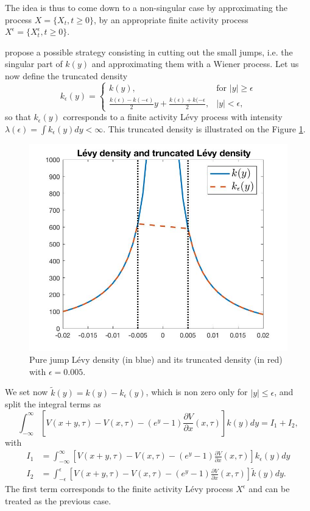 The idea is thus to come down to a non-singular case by approximating the process $X = \{X_t, t\geq 0\}$, by an appropriate finite activity process $X^\epsilon =\{X_t^\epsilon,t\geq0\}$.

\citeauthor{CV05} propose a possible strategy consisting in cutting out the small jumps, i.e. the singular part of $k(y)$ and approximating them with a Wiener process. Let us now define the truncated density 
$$k_\epsilon(y)=\begin{cases}
k(y), &\text{for }|y|\geq\epsilon\\
\frac{k(\epsilon)-k(-\epsilon)}{2}y+\frac{k(\epsilon)+k(-\epsilon}{2}, &|y|<\epsilon,
\end{cases}$$
so that $k_\epsilon(y)$ corresponds to a finite activity L\'evy process with intensity $\lambda(\epsilon) = \int k_\epsilon(y)dy < \infty$. This truncated density is illustrated on the Figure \ref{fig:FD:pj_density}.
\begin{figure}[!htb]
\centering
	\includegraphics[scale=0.3]{gfx/Trunc_density}
	\caption{Pure jump L\'evy density (in blue) and its truncated density (in red) with $\epsilon = 0.005$.}
	\label{fig:FD:pj_density}
\end{figure}

We set now $\tilde{k}(y) = k(y) -k_\epsilon(y)$, which is non zero only for $|y|\leq\epsilon$, and split the integral terms as
$$\int_{-\infty}^\infty \left[V(x+y,\tau)-V(x,\tau)-\left(e^y-1\right)\frac{\partial V}{\partial x}(x,\tau)\right]k(y)dy =I_1+I_2,$$
with
\begin{align*}
I_1 &= \int_{-\infty}^{\infty}\left[V(x+y,\tau)-V(x,\tau)-\left(e^y-1\right)\frac{\partial V}{\partial x}(x,\tau)\right]k_\epsilon(y)dy\\
I_2 &= \int_{-\epsilon}^{\epsilon}\left[V(x+y,\tau)-V(x,\tau)-\left(e^y-1\right)\frac{\partial V}{\partial x}(x,\tau)\right]\tilde{k}(y)dy.
\end{align*}
The first term corresponds to the finite activity L\'evy process $X^\epsilon$ and can be treated as the previous case.

